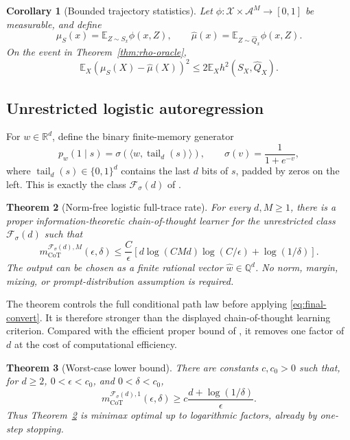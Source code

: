 \documentclass{article}
\newtheorem{theorem}{Theorem}
\newtheorem{corollary}[theorem]{Corollary}
\theoremstyle{definition}
\theoremstyle{remark}
\newcommand{\E}{\mathbb E}
\newcommand{\cA}{\mathcal A}
\newcommand{\cF}{\mathcal F}
\newcommand{\cX}{\mathcal X}
\newcommand{\tail}{\operatorname{tail}}
\begin{document}
\begin{corollary}[Bounded trajectory statistics]
\label{cor:statistics}
Let $\phi:\cX\times\cA^M\to[0,1]$ be measurable, and define \[ \mu_S(x)=\E_{Z\sim S_x}\phi(x,Z), \qquad \widehat\mu(x)=\E_{Z\sim\widehat Q_x}\phi(x,Z). \] On the event in Theorem~\ref{thm:rho-oracle}, \[ \E_X(\mu_S(X)-\widehat\mu(X))^2 \le2\E_Xh^2(S_X,\widehat Q_X). \]
\end{corollary}

\subsection{Unrestricted logistic autoregression}

For $w\in\mathbb R^d$, define the binary finite-memory generator
\begin{equation}
\label{eq:logistic-model}
p_w(1\mid s)=\sigma(\langle w,\tail_d(s)\rangle),
\qquad
\sigma(v)=\frac{1}{1+e^{-v}},
\end{equation}
where $\tail_d(s)\in\{0,1\}^d$ contains the last $d$ bits of $s$, padded by zeros on the left. This is exactly the class $\cF_\sigma(d)$ of \citet{doronarad2026stochastic}.

\begin{theorem}[Norm-free logistic full-trace rate]
\label{thm:logistic}
For every $d,M\ge1$, there is a proper information-theoretic chain-of-thought learner for the unrestricted class $\cF_\sigma(d)$ such that
\begin{equation}
\label{eq:logistic-sample}
m_{\mathrm{CoT}}^{\cF_\sigma(d),M}(\epsilon,\delta)
\le\frac{C}{\epsilon}\left[d\log(CMd)\log(C/\epsilon)+\log(1/\delta)\right].
\end{equation}
The output can be chosen as a finite rational vector $\widehat w\in\mathbb Q^d$. No norm, margin, mixing, or prompt-distribution assumption is required.
\end{theorem}

The theorem controls the full conditional path law before applying \eqref{eq:final-convert}. It is therefore stronger than the displayed chain-of-thought learning criterion. Compared with the efficient proper bound of \citet{doronarad2026stochastic}, it removes one factor of $d$ at the cost of computational efficiency.

\begin{theorem}[Worst-case lower bound]
\label{thm:lower}
There are constants $c,c_0>0$ such that, for $d\ge2$, $0<\epsilon<c_0$, and $0<\delta<c_0$, \[ m_{\mathrm{CoT}}^{\cF_\sigma(d),1}(\epsilon,\delta) \ge c\frac{d+\log(1/\delta)}{\epsilon}. \] Thus Theorem~\ref{thm:logistic} is minimax optimal up to logarithmic factors, already by one-step stopping.
\end{theorem}
\end{document}
